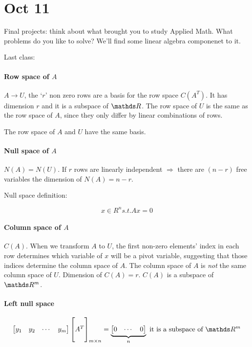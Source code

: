 \section{Oct 11}

Final projects: think about what brought you to study Applied Math. What problems do you like to solve? We'll find some linear algebra componenet to it.

Last class:

\paragraph{Row space of $A$} $A \rightarrow U$, the `$r$' non zero rows are a basis for the row space $C(A^T)$. It has dimension $r$ and it is a subspace of $\bbR$. The row space of $U$ is the same as the row space of $A$, since they only differ by linear combinations of rows.

The row space of $A$ and $U$ have the same basis.

\paragraph{Null space of $A$} $N(A) = N(U)$. If $r$ rows are linearly independent $\Rightarrow$ there are $(n-r)$ free variables the dimension of $N(A) = n-r$. 

Null space definition:

\[
  x \in R^n s.t. Ax = 0
\]

\paragraph{Column space of $A$} $C(A)$. When we transform $A$ to $U$, the first non-zero elements' index in each row determines which variable of $x$ will be a pivot variable, suggesting that those indices determine the column space of $A$. The column space of $A$ is \textit{not} the same column space of $U$. Dimension of $C(A) = r$. $C(A)$ is a subspace of $\bbR^m$.

\paragraph{Left null space}

\[
  \begin{bmatrix}
    y_1 & y_2 & \cdots & y_m
  \end{bmatrix}
  \begin{bmatrix}
    \\ A^T \\ \\
  \end{bmatrix}_{m \times n} =
  \underbrace{\begin{bmatrix}
    0 & \cdots & 0
  \end{bmatrix}}_n
  \text{ it is a subspace of } \bbR^m
\]

